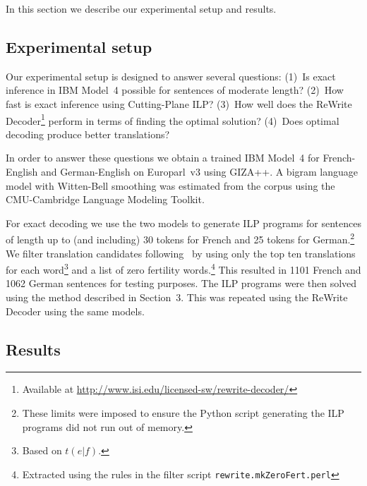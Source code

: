 \vspace{-1ex}
In this section we describe our experimental setup and results.
\vspace{-1ex}
\subsection{Experimental setup}
\label{sec:experimental-setup}

Our experimental setup is designed to answer several questions: (1)~Is
exact inference in IBM Model~4 possible for sentences of moderate
length? (2)~How fast is exact inference using Cutting-Plane ILP?
(3)~How well does the ReWrite Decoder\footnote{Available at
  \url{http://www.isi.edu/licensed-sw/rewrite-decoder/}} perform in
terms of finding the optimal solution? (4)~Does optimal decoding
produce better translations?

In order to answer these questions we obtain a trained IBM Model~4 for
French-English and German-English on Europarl~v3 using GIZA++.  A
bigram language model with Witten-Bell smoothing was estimated from
the corpus using the CMU-Cambridge Language Modeling Toolkit.

For exact decoding we use the two models to generate ILP programs for
sentences of length up to (and including) 30 tokens for French and 25
tokens for German.\footnote{These limits were imposed to ensure the
  Python script generating the ILP programs did not run out of
  memory.}  We filter translation candidates
following~\cite{GermannFast04} by using only the top ten translations
for each word\footnote{Based on $t(e|f)$.} and a list of zero
fertility words.\footnote{Extracted using the rules in the filter
  script \texttt{rewrite.mkZeroFert.perl}} This resulted in 1101
French and 1062 German sentences for testing purposes.  The ILP
programs were then solved using the method described in Section~3.
This was repeated using the ReWrite Decoder using the same models.


\subsection{Results}
\label{sec:results-results}

